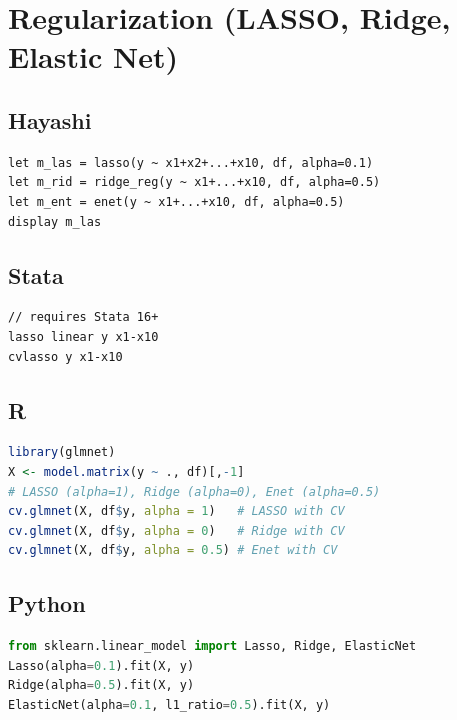 \section{Regularization (LASSO, Ridge, Elastic Net)}

\subsection*{Hayashi}

\begin{lstlisting}
let m_las = lasso(y ~ x1+x2+...+x10, df, alpha=0.1)
let m_rid = ridge_reg(y ~ x1+...+x10, df, alpha=0.5)
let m_ent = enet(y ~ x1+...+x10, df, alpha=0.5)
display m_las
\end{lstlisting}

\subsection*{Stata}

\begin{lstlisting}[language={}, basicstyle=\ttfamily\small,
  frame=single, numbers=none, backgroundcolor=\color{codbg}]
// requires Stata 16+
lasso linear y x1-x10
cvlasso y x1-x10
\end{lstlisting}

\subsection*{R}

\begin{lstlisting}[language=R, basicstyle=\ttfamily\small,
  frame=single, numbers=none, backgroundcolor=\color{codbg},
  keywordstyle=\color{keyword}\bfseries,
  stringstyle=\color{string},
  commentstyle=\color{comment}\itshape]
library(glmnet)
X <- model.matrix(y ~ ., df)[,-1]
# LASSO (alpha=1), Ridge (alpha=0), Enet (alpha=0.5)
cv.glmnet(X, df$y, alpha = 1)   # LASSO with CV
cv.glmnet(X, df$y, alpha = 0)   # Ridge with CV
cv.glmnet(X, df$y, alpha = 0.5) # Enet with CV
\end{lstlisting}

\subsection*{Python}

\begin{lstlisting}[language=Python, basicstyle=\ttfamily\small,
  frame=single, numbers=none, backgroundcolor=\color{codbg},
  keywordstyle=\color{keyword}\bfseries,
  stringstyle=\color{string},
  commentstyle=\color{comment}\itshape]
from sklearn.linear_model import Lasso, Ridge, ElasticNet
Lasso(alpha=0.1).fit(X, y)
Ridge(alpha=0.5).fit(X, y)
ElasticNet(alpha=0.1, l1_ratio=0.5).fit(X, y)
\end{lstlisting}

